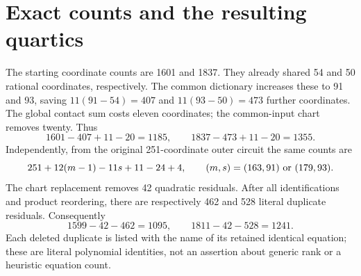 \documentclass[11pt]{article}
\begin{document}
\section{Exact counts and the resulting quartics}

The starting coordinate counts are 1601 and 1837. They already shared
54 and 50 rational coordinates, respectively. The common dictionary
increases these to 91 and 93, saving \(11(91-54)=407\) and
\(11(93-50)=473\) further coordinates. The global contact sum costs
eleven coordinates; the common-input chart removes twenty. Thus
\[
       1601-407+11-20=1185,\qquad
       1837-473+11-20=1355.
\]
Independently, from the original 251-coordinate outer circuit the
same counts are
\[
       251+12(m-1)-11s+11-24+4,
       \qquad (m,s)=(163,91)\ \hbox{or}\ (179,93).
\]
The chart replacement removes 42 quadratic residuals. After all
identifications and product reordering, there are respectively 462
and 528 literal duplicate residuals. Consequently
\[
              1599-42-462=1095,\qquad
              1811-42-528=1241.
\]
Each deleted duplicate is listed with the name of its retained
identical equation; these are literal polynomial identities, not
an assertion about generic rank or a heuristic equation count.
\end{document}
